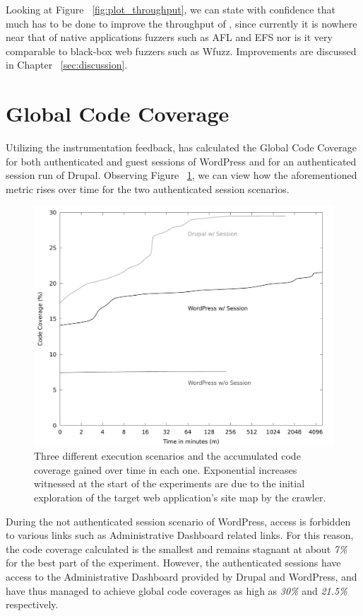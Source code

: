 Looking at Figure ~\ref{fig:plot_throughput}, we can state with confidence that much has to be done to improve the throughput of \pname{}, since currently it is nowhere near that of native applications fuzzers such as AFL and EFS nor is it very comparable to black-box web fuzzers such as Wfuzz. Improvements are discussed in Chapter ~\ref{sec:discussion}.

\section{Global Code Coverage}
Utilizing the instrumentation feedback, \pname{} has calculated the Global Code Coverage for both authenticated and guest sessions of WordPress and for an authenticated session run of Drupal. Observing Figure ~\ref{fig:plot_coverage}, we can view how the aforementioned metric rises over time for the two authenticated session scenarios.

\begin{figure}[!htb]
  \centering \includegraphics[width=\linewidth]{figures/plot_coverage.pdf}
  \caption{Three different execution scenarios and the accumulated code coverage gained over time in each one. Exponential increases witnessed at the start of the experiments are due to the initial exploration of the target web application's site map by the crawler.} 
  \label{fig:plot_coverage}
\end{figure}

During the not authenticated session scenario of WordPress, access is forbidden to various links such as Administrative Dashboard related links. For this reason, the code coverage calculated is the smallest and remains stagnant at about \emph{7\%} for the best part of the experiment. However, the authenticated sessions have access to the Administrative Dashboard provided by Drupal and WordPress, and have thus managed to achieve global code coverages as high as \emph{30\%} and \emph{21.5\%} respectively. 

